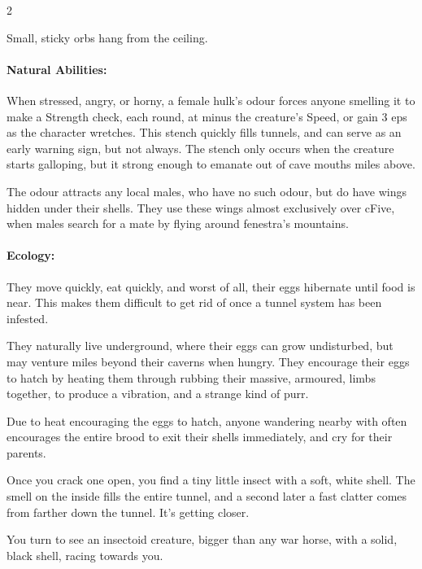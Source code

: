 \begin{multicols}{2}
\begin{boxtext}
  Small, sticky orbs hang from the ceiling.
\end{boxtext}

\paragraph{Natural Abilities:} When stressed, angry, or horny, a female \gls{hulk}'s odour forces anyone smelling it to make a Strength check, each \gls{round}, at \tn[10] minus the creature's Speed, or gain 3 \glspl{ep} as the character wretches.
This stench quickly fills tunnels, and can serve as an early warning sign, but not always.
The stench only occurs when the creature starts galloping, but it strong enough to emanate out of cave mouths miles above.

The odour attracts any local males, who have no such odour, but do have wings hidden under their shells.
They use these wings almost exclusively over \gls{cFive}, when males search for a mate by flying around \gls{fenestra}'s mountains.

\paragraph{Ecology:}
They move quickly, eat quickly, and worst of all, their eggs hibernate until food is near.
This makes them difficult to get rid of once a tunnel system has been infested.

They naturally live underground, where their eggs can grow undisturbed, but may venture miles beyond their caverns when hungry.
They encourage their eggs to hatch by heating them through rubbing their massive, armoured, limbs together, to produce a vibration, and a strange kind of purr.

Due to heat encouraging the eggs to hatch, anyone wandering nearby with  often encourages the entire brood to exit their shells immediately, and cry for their parents.

\begin{boxtext}
  Once you crack one open, you find a tiny little insect with a soft, white shell.
  The smell on the inside fills the entire tunnel, and a second later a fast clatter comes from farther down the tunnel.
  It's getting closer.

  You turn to see an insectoid creature, bigger than any war horse, with a solid, black shell, racing towards you.
\end{boxtext}


\end{multicols}
